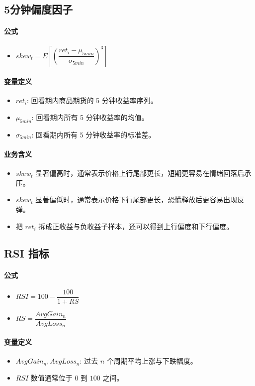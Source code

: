 \documentclass[11pt,a4paper]{ctexart}
\begin{document}
\subsection{5分钟偏度因子}
\paragraph{公式}
\begin{itemize}
\item $skew_t=E\left[\left(\dfrac{ret_i-\mu_{5min}}{\sigma_{5min}}\right)^3\right]$
\end{itemize}
\paragraph{变量定义}
\begin{itemize}
\item $ret_i$: 回看期内商品期货的 5 分钟收益率序列。
\item $\mu_{5min}$: 回看期内所有 5 分钟收益率的均值。
\item $\sigma_{5min}$: 回看期内所有 5 分钟收益率的标准差。
\end{itemize}
\paragraph{业务含义}
\begin{itemize}
\item $skew_t$ 显著偏高时，通常表示价格上行尾部更长，短期更容易在情绪回落后承压。
\item $skew_t$ 显著偏低时，通常表示价格下行尾部更长，恐慌释放后更容易出现反弹。
\item 把 $ret_i$ 拆成正收益与负收益子样本，还可以得到上行偏度和下行偏度。
\end{itemize}
\subsection{RSI 指标}
\paragraph{公式}
\begin{itemize}
\item $RSI=100-\dfrac{100}{1+RS}$
\item $RS=\dfrac{AvgGain_n}{AvgLoss_n}$
\end{itemize}
\paragraph{变量定义}
\begin{itemize}
\item $AvgGain_n, AvgLoss_n$: 过去 $n$ 个周期平均上涨与下跌幅度。
\item $RSI$ 数值通常位于 $0$ 到 $100$ 之间。
\end{itemize}
\end{document}
